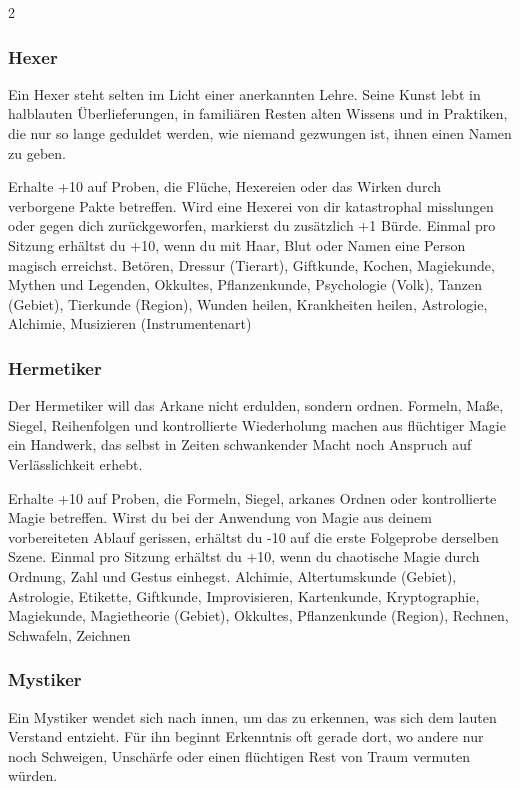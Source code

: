 {\begin{multicols*}{2}
        \subsubsection*{Hexer}
        Ein Hexer steht selten im Licht einer anerkannten Lehre. Seine Kunst lebt in halblauten Überlieferungen, in familiären Resten alten Wissens und in Praktiken, die nur so lange geduldet werden, wie niemand gezwungen ist, ihnen einen Namen zu geben.

        \wegespielwertebox
        {Erhalte +10 auf Proben, die Flüche, Hexereien oder das Wirken durch verborgene Pakte betreffen.}
        {Wird eine Hexerei von dir katastrophal misslungen oder gegen dich zurückgeworfen, markierst du zusätzlich +1 Bürde.}
        {Einmal pro Sitzung erhältst du +10, wenn du mit Haar, Blut oder Namen eine Person magisch erreichst.}
        {Betören, Dressur (Tierart), Giftkunde, Kochen, Magiekunde, Mythen und Legenden, Okkultes, Pflanzenkunde, Psychologie (Volk), Tanzen (Gebiet), Tierkunde (Region), Wunden heilen, Krankheiten heilen, Astrologie, Alchimie, Musizieren (Instrumentenart)}

        \subsubsection*{Hermetiker}
        Der Hermetiker will das Arkane nicht erdulden, sondern ordnen. Formeln, Maße, Siegel, Reihenfolgen und kontrollierte Wiederholung machen aus flüchtiger Magie ein Handwerk, das selbst in Zeiten schwankender Macht noch Anspruch auf Verlässlichkeit erhebt.

        \wegespielwertebox
        {Erhalte +10 auf Proben, die Formeln, Siegel, arkanes Ordnen oder kontrollierte Magie betreffen.}
        {Wirst du bei der Anwendung von Magie aus deinem vorbereiteten Ablauf gerissen, erhältst du -10 auf die erste Folgeprobe derselben Szene.}
        {Einmal pro Sitzung erhältst du +10, wenn du chaotische Magie durch Ordnung, Zahl und Gestus einhegst.}
        {Alchimie, Altertumskunde (Gebiet), Astrologie, Etikette, Giftkunde, Improvisieren, Kartenkunde, Kryptographie, Magiekunde, Magietheorie (Gebiet), Okkultes, Pflanzenkunde (Region), Rechnen, Schwafeln, Zeichnen}

        \subsubsection*{Mystiker}
        Ein Mystiker wendet sich nach innen, um das zu erkennen, was sich dem lauten Verstand entzieht. Für ihn beginnt Erkenntnis oft gerade dort, wo andere nur noch Schweigen, Unschärfe oder einen flüchtigen Rest von Traum vermuten würden.


\end{multicols*}}

